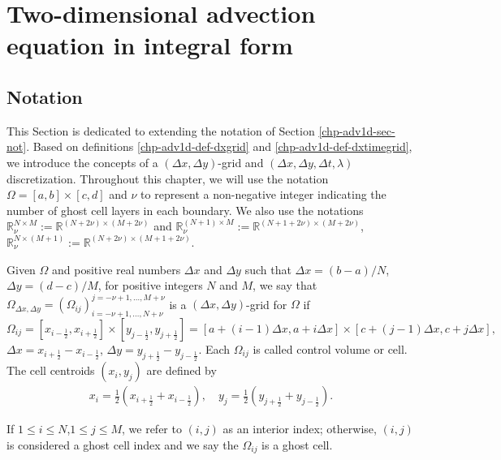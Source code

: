 \section{Two-dimensional advection equation in integral form}
\label{sec-adv2d}
\subsection{Notation}
\label{chp-adv2d-sec-not}
This Section is dedicated to extending the notation of Section \ref{chp-adv1d-sec-not}.
Based on definitions \ref{chp-adv1d-def-dxgrid} and \ref{chp-adv1d-def-dxtimegrid},
we introduce the concepts of a $(\Delta x,\Delta y)$-grid and $(\Delta x, \Delta y, \Delta t, \lambda)$ discretization.
Throughout this chapter, we will use the notation $\Omega=[a,b]\times[c,d]$
and $\nu$ to represent a non-negative integer indicating the number of ghost cell layers in each boundary.
We also use the notations $\mathbb{R}^{N\times M}_{\nu}:=\mathbb{R}^{(N+2\nu)\times (M+2\nu)}$ and
$\mathbb{R}^{(N+1)\times M}_{\nu}:=\mathbb{R}^{(N+1+2\nu)\times (M+2\nu)}$,
$\mathbb{R}^{N\times (M+1)}_{\nu}:=\mathbb{R}^{(N+2\nu)\times (M+1+2\nu)}$.
\begin{definition}
	\label{chp-adv1d-def-2dgrid}
	Given $\Omega$ and positive real numbers $\Delta x$ and $\Delta y$ such that $\Delta x = (b-a)/N$, 
	$\Delta y = (d-c)/M$, for positive integers $N$ and $M$,
	we say that $\Omega_{\Delta x, \Delta y}=(\Omega_{ij})_{i=-\nu+1,\ldots,N+\nu}^{j=-\nu+1,\ldots,M+\nu}$
	is a $(\Delta x, \Delta y)$-grid for $\Omega$ if
    \begin{equation*}
	\Omega_{ij} = [x_{i-\frac{1}{2}}, x_{i+\frac{1}{2}}]\times [y_{j-\frac{1}{2}}, y_{j+\frac{1}{2}}] =
    [a+(i-1)\Delta x,a+i\Delta x]\times [c+(j-1)\Delta x,c+j\Delta x],
    \end{equation*}
	$\Delta x = x_{i+\frac{1}{2}}-x_{i-\frac{1}{2}}$, $\Delta y = y_{j+\frac{1}{2}}-y_{j-\frac{1}{2}}$.
	Each $\Omega_{ij}$ is called control volume or cell.
	The cell centroids $(x_i,y_j)$ are defined by
    \begin{align*}
       x_i = \frac{1}{2}(x_{i+\frac{1}{2}} + x_{i-\frac{1}{2}}), \quad y_j = \frac{1}{2}(y_{j+\frac{1}{2}} + y_{j-\frac{1}{2}}).
    \end{align*}
\end{definition}
\begin{remark}
If $1 \leq i \leq N$,$1 \leq j \leq M$, we refer to $(i,j)$ as an interior index;
otherwise, $(i,j)$ is considered a ghost cell index and we say the $\Omega_{ij}$ is a ghost cell.
\end{remark}
